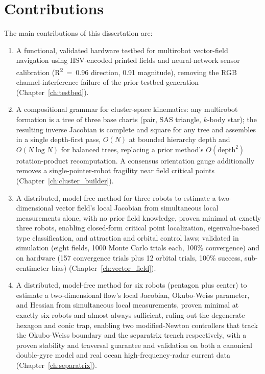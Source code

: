 \documentclass[12pt, letterpaper, oneside]{report}
\begin{document}
\section{Contributions}

The main contributions of this dissertation are:

\begin{enumerate}
\item A functional, validated hardware testbed for multirobot vector-field
  navigation using HSV-encoded printed fields and neural-network sensor
  calibration (R\textsuperscript{2}~=~0.96 direction, 0.91 magnitude),
  removing the RGB channel-interference failure of the prior testbed
  generation (Chapter~\ref{ch:testbed}).
\item A compositional grammar for cluster-space kinematics: any multirobot
  formation is a tree of three base charts (pair, SAS triangle, $k$-body
  star); the resulting inverse Jacobian is complete and square for any tree
  and assembles in a single depth-first pass, $O(N)$ at bounded hierarchy
  depth and $O(N\log N)$ for balanced trees, replacing a prior method's
  $O(\text{depth}^2)$ rotation-product recomputation. A consensus
  orientation gauge additionally removes a single-pointer-robot fragility
  near field critical points (Chapter~\ref{ch:cluster_builder}).
\item A distributed, model-free method for three robots to estimate a
  two-dimensional vector field's local Jacobian from simultaneous local
  measurements alone, with no prior field knowledge, proven minimal at
  exactly three robots, enabling closed-form critical point localization,
  eigenvalue-based type classification, and attraction and orbital control
  laws; validated in simulation (eight fields, 1000 Monte Carlo trials each,
  100\% convergence) and on hardware (157 convergence trials plus 12 orbital
  trials, 100\% success, sub-centimeter bias) (Chapter~\ref{ch:vector_field}).
\item A distributed, model-free method for six robots (pentagon plus center)
  to estimate a two-dimensional flow's local Jacobian, Okubo-Weiss parameter,
  and Hessian from simultaneous local measurements, proven minimal at exactly
  six robots and almost-always sufficient, ruling out the degenerate hexagon
  and conic trap, enabling two modified-Newton controllers that track the
  Okubo-Weiss boundary and the separatrix trench respectively, with a proven
  stability and traversal guarantee and validation on both a canonical
  double-gyre model and real ocean high-frequency-radar current data
  (Chapter~\ref{ch:separatrix}).
\end{enumerate}
\end{document}
